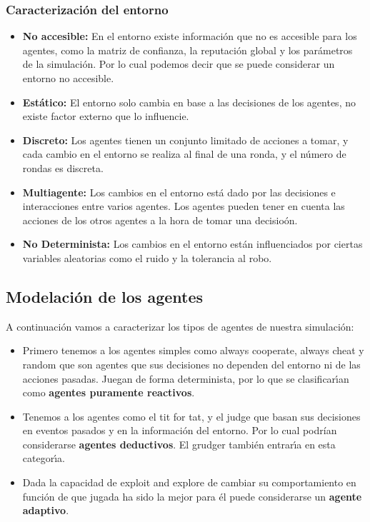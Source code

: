 \documentclass{article}
\begin{document}
\subsubsection[short]{Caracterizaci\'on del entorno}
\begin{itemize}
      \item \textbf{No accesible:} En el entorno existe informaci\'on que no es accesible para los agentes, como la matriz de confianza, la reputaci\'on global y los par\'ametros
            de la simulaci\'on. Por lo cual podemos decir que se puede considerar un entorno no accesible.
      \item \textbf{Est\'atico:} El entorno solo cambia en base a las decisiones de los agentes, no existe factor externo que lo influencie.
      \item \textbf{Discreto:} Los agentes tienen un conjunto limitado de acciones a tomar, y cada cambio en el entorno se realiza al final de una ronda, y el n\'umero de rondas es discreta.
      \item \textbf{Multiagente:} Los cambios en el entorno est\'a dado por las decisiones e interacciones entre varios agentes. Los agentes pueden tener en cuenta las acciones de los
            otros agentes a la hora de tomar una decisio\'on.
      \item \textbf{No Determinista:} Los cambios en el entorno est\'an influenciados por ciertas variables aleatorias como el ruido y la tolerancia al robo.
\end{itemize}


\subsection{Modelaci\'on de los agentes}
A continuaci\'on vamos a caracterizar los tipos de agentes de nuestra simulaci\'on:
\begin{itemize}
      \item Primero tenemos a los agentes simples como always cooperate, always cheat y random que son agentes que sus decisiones no dependen del entorno
            ni de las acciones pasadas. Juegan de forma determinista, por lo que se clasificar\'{\i}an como \textbf{agentes puramente reactivos}.
      \item Tenemos a los agentes como el tit for tat, y el judge que basan sus decisiones en eventos pasados y en la informaci\'on del entorno. Por lo cual podr\'ian
            considerarse \textbf{agentes deductivos}. El grudger tambi\'en entrar\'{\i}a en esta categor\'{\i}a.
      \item Dada la capacidad de exploit and explore de cambiar su comportamiento en funci\'on de que jugada ha sido la mejor para \'el puede considerarse un
            \textbf{agente adaptivo}.
\end{itemize}
\newpage
\end{document}
